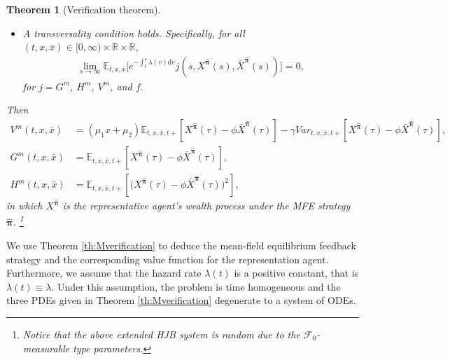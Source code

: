 \documentclass[11pt]{article}
\newtheorem{theorem}{Theorem}[section]
\newcommand \drm {\mathrm{d}}
\numberwithin{equation}{section}
\begin{document}
\begin{theorem}[Verification theorem]
\begin{itemize}
			\item[$(4)$] A transversality condition holds. Specifically, for all \( (t,x,
			\bar{x})\in {[0,\infty)}\times \mathbb{R}\times \mathbb{R}\),
			\begin{align}\label{eq:M-T}
				\lim_{s\to \infty}\mathbb{E}_{t,x,\bar{x}}\Big[e^{-\int_t^s \lambda(v)\drm v} j(s,X^{\bm{\widehat{\pi}}}(s),\bar{X}^{\bm{\widehat{\pi}}}(s))\Big]=0,
			\end{align}
			for \(j=G^{\scriptscriptstyle m}\), \(H^{\scriptscriptstyle m}\), \(V^{\scriptscriptstyle m}\), and \(f\).
		\end{itemize}
		
		
		Then
		\begin{align*}
			V^{\scriptscriptstyle m}(t,x,\bar{x})&=	(\mu_1 x+\mu_2)\mathbb{E}_{t,x,\bar{x},t+}[X^{\widehat{\bm{\pi}}}(\tau)-\phi\bar{X}^{\bm{\widehat{\pi}}}(\tau)]-\gamma Var_{t,x,\bar{x},t+}[X^{\widehat{\bm{\pi}}}(\tau)-\phi\bar{X}^{\bm{\widehat{\pi}}}(\tau)],\\
			G^{\scriptscriptstyle m}(t,x,\bar{x})&=\mathbb{E}_{t,x,\bar{x},t+}[X^{\widehat{\bm{\pi}}}(\tau)-\phi \bar{X}^{\bm{\widehat{\pi}}}(\tau)],\\
			H^{\scriptscriptstyle m}(t,x,\bar{x})&=\mathbb{E}_{t,x,\bar{x},t+}\left[\big(X^{\widehat{\bm{\pi}}}(\tau)-\phi \bar{X}^{\bm{\widehat{\pi}}}(\tau)\big)^2\right],
		\end{align*}
		in which $X^{\widehat{\bm{\pi}}}$ is the representative agent's wealth process  under the MFE strategy $\widehat{\bm{\pi}}$. \footnote{Notice that the above extended HJB system is random due to the $\mathcal{F}_0$-measurable type parameters.}
	\end{theorem}
	
	We use Theorem \ref{th:Mverification} to deduce the mean-field equilibrium feedback strategy and the corresponding value function for the representation agent. Furthermore, we assume that the hazard rate \(\lambda(t)\) is a positive constant, that is \(\lambda(t)\equiv \lambda\). Under this assumption, the problem is time homogeneous and the three PDEs given in Theorem \ref{th:Mverification} degenerate to a system of ODEs.
		
\end{document}
